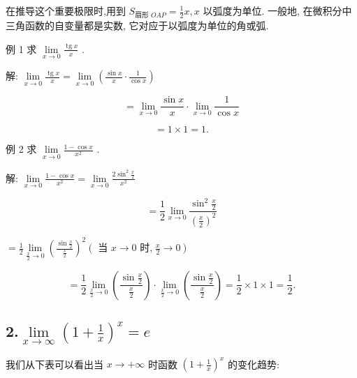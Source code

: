 \documentclass[lang=cn,newtx,10pt,scheme=chinese]{elegantbook}
\begin{document}
在推导这个重要极限时,用到 \({S}_{\text{扇形 }{OAP}} = \frac{1}{2}x,x\) 以弧度为单位. 一般地, 在微积分中三角函数的自变量都是实数, 它对应于以弧度为单位的角或弧.

例 1 求 \(\mathop{\lim }\limits_{{x \rightarrow 0}}\frac{\operatorname{tg}x}{x}\) .

解: \(\mathop{\lim }\limits_{{x \rightarrow 0}}\frac{\operatorname{tg}x}{x} = \mathop{\lim }\limits_{{x \rightarrow 0}}\left( {\frac{\sin x}{x} \cdot \frac{1}{\cos x}}\right)\)

\[
= \mathop{\lim }\limits_{{x \rightarrow 0}}\frac{\sin x}{x} \cdot \mathop{\lim }\limits_{{x \rightarrow 0}}\frac{1}{\cos x}
\]

\[
= 1 \times 1 = 1\text{.}
\]

例 2 求 \(\mathop{\lim }\limits_{{x \rightarrow 0}}\frac{1 - \cos x}{{x}^{2}}\) .

解: \(\mathop{\lim }\limits_{{x \rightarrow 0}}\frac{1 - \cos x}{{x}^{2}} = \mathop{\lim }\limits_{{x \rightarrow 0}}\frac{2{\sin }^{2}\frac{x}{2}}{{x}^{2}}\)

\[
= \frac{1}{2}\mathop{\lim }\limits_{{x \rightarrow 0}}\frac{{\sin }^{2}\frac{x}{2}}{{\left( \frac{x}{2}\right) }^{2}}
\]

\(= \frac{1}{2}\mathop{\lim }\limits_{{\frac{x}{2} \rightarrow 0}}{\left( \frac{\sin \frac{x}{2}}{\frac{x}{2}}\right) }^{2}\left( {\text{ 当 }x \rightarrow 0\text{ 时,}\;\frac{x}{2} \rightarrow 0}\right)\)

\[
= \frac{1}{2}\mathop{\lim }\limits_{{\frac{x}{2} \rightarrow 0}}\left( \frac{\sin \frac{x}{2}}{\frac{x}{2}}\right) \cdot \mathop{\lim }\limits_{{\frac{x}{2} \rightarrow 0}}\left( \frac{\sin \frac{x}{2}}{\frac{x}{2}}\right) = \frac{1}{2} \times 1 \times 1 = \frac{1}{2}\text{.}
\]


\subsection*{2.\(\mathop{\lim }\limits_{{x \rightarrow \infty }}{\left( 1 + \frac{1}{x}\right) }^{x} = e\)}

我们从下表可以看出当 \(x \rightarrow + \infty\) 时函数 \({\left( 1 + \frac{1}{x}\right) }^{x}\) 的变化趋势:
\end{document}
